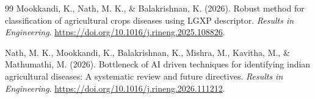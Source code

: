 \documentclass[]{interact}
\theoremstyle{plain}
\theoremstyle{definition}
\theoremstyle{remark}
\begin{document}
\begin{thebibliography}{99}
Mookkandi, K., Nath, M. K., \& Balakrishnan, K. (2026). Robust method for classification of agricultural crops diseases using LGXP descriptor. \emph{Results in Engineering}. \url{https://doi.org/10.1016/j.rineng.2025.108826}.

Nath, M. K., Mookkandi, K., Balakrishnan, K., Mishra, M., Kavitha, M., \& Mathumathi, M. (2026). Bottleneck of AI driven techniques for identifying indian agricultural diseases: A systematic review and future directives. \emph{Results in Engineering}. \url{https://doi.org/10.1016/j.rineng.2026.111212}.

\end{thebibliography}
\end{document}
